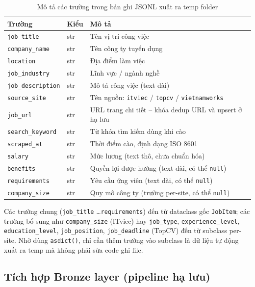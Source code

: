 \begin{table}[h!]
\centering
\caption{Mô tả các trường trong bản ghi JSONL xuất ra temp folder}
\label{tab:temp-fields}
\begin{tabular}{p{} p{} p{}}
\toprule
\textbf{Trường} & \textbf{Kiểu} & \textbf{Mô tả} \\
\midrule
\texttt{job\_title}        & str & Tên vị trí công việc \\
\texttt{company\_name}     & str & Tên công ty tuyển dụng \\
\texttt{location}          & str & Địa điểm làm việc \\
\texttt{job\_industry}     & str & Lĩnh vực / ngành nghề \\
\texttt{job\_description}  & str & Mô tả công việc (text dài) \\
\texttt{source\_site}      & str & Tên nguồn: \texttt{itviec} / \texttt{topcv} / \texttt{vietnamworks} \\
\texttt{job\_url}          & str & URL trang chi tiết -- khóa dedup URL và upsert ở hạ lưu \\
\texttt{search\_keyword}   & str & Từ khóa tìm kiếm dùng khi cào \\
\texttt{scraped\_at}       & str & Thời điểm cào, định dạng ISO 8601 \\
\texttt{salary}            & str & Mức lương (text thô, chưa chuẩn hóa) \\
\texttt{benefits}          & str & Quyền lợi được hưởng (text dài, có thể \texttt{null}) \\
\texttt{requirements}      & str & Yêu cầu ứng viên (text dài, có thể \texttt{null}) \\
\texttt{company\_size}     & str & Quy mô công ty (trường per-site, có thể \texttt{null}) \\
\bottomrule
\end{tabular}
\end{table}

Các trường chung (\texttt{job\_title} \ldots \texttt{requirements}) đến từ
dataclass gốc \texttt{JobItem}; các trường bổ sung như
\texttt{company\_size} (ITviec) hay \texttt{job\_type},
\texttt{experience\_level}, \texttt{education\_level}, \texttt{job\_position},
\texttt{job\_deadline} (TopCV) đến từ subclass per-site. Nhờ dùng
\texttt{asdict()}, chỉ cần thêm trường vào subclass là dữ liệu tự động xuất ra
temp mà không phải sửa code ghi file.


\subsection{Tích hợp Bronze layer (pipeline hạ lưu)}
\label{subsec:crawl-bronze}

